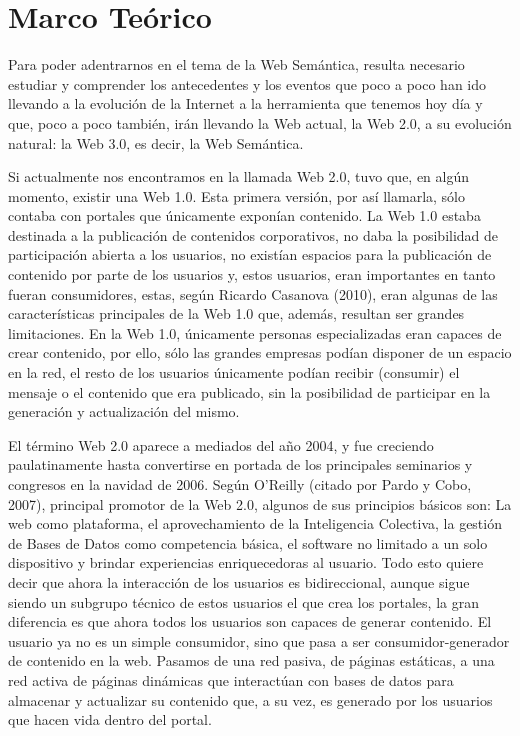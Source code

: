 \chapter{Marco Teórico}
\label{chap:marcoTeorico}

Para poder adentrarnos en el tema de la Web Semántica, resulta necesario estudiar y comprender los antecedentes y los eventos que poco a poco han ido llevando a la evolución de la Internet a la herramienta que tenemos hoy día y que, poco a poco también, irán llevando la Web actual, la Web 2.0, a su evolución natural: la Web 3.0, es decir, la Web Semántica.

Si actualmente nos encontramos en la llamada Web 2.0, tuvo que, en algún momento, existir una Web 1.0. Esta primera versión, por así llamarla, sólo contaba con portales que únicamente exponían contenido. La Web 1.0 estaba destinada a la publicación de contenidos corporativos, no daba la posibilidad de participación abierta a los usuarios, no existían espacios para la publicación de contenido por parte de los usuarios y, estos usuarios, eran importantes en tanto fueran consumidores, estas, según Ricardo Casanova (2010), eran algunas de las características principales de la Web 1.0 que, además, resultan ser grandes limitaciones. En la Web 1.0, únicamente personas especializadas eran capaces de crear contenido, por ello, sólo las grandes empresas podían disponer de un espacio en la red, el resto de los usuarios únicamente podían recibir (consumir) el mensaje o el contenido que era publicado, sin la posibilidad de participar en la generación y actualización del mismo.

El término Web 2.0 aparece a mediados del año 2004, y fue creciendo paulatinamente hasta convertirse en portada de los principales seminarios y congresos en la navidad de 2006. Según O'Reilly (citado por Pardo y Cobo, 2007), principal promotor de la Web 2.0, algunos de sus principios básicos son: La web como plataforma, el aprovechamiento de la Inteligencia Colectiva, la gestión de Bases de Datos como competencia básica, el software no limitado a un solo dispositivo y brindar experiencias enriquecedoras al usuario. Todo esto quiere decir que ahora la interacción de los usuarios es bidireccional, aunque sigue siendo un subgrupo técnico de estos usuarios el que crea los portales, la gran diferencia es que ahora todos los usuarios son capaces de generar contenido. El usuario ya no es un simple consumidor, sino que pasa a ser consumidor-generador de contenido en la web. Pasamos de una red pasiva, de páginas estáticas, a una red activa de páginas dinámicas que interactúan con bases de datos para almacenar y actualizar su contenido que, a su vez, es generado por los usuarios que hacen vida dentro del portal.

